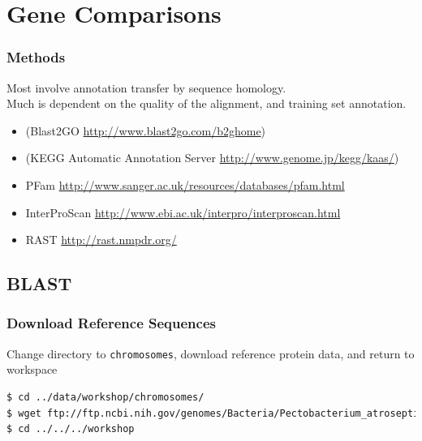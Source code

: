 \documentclass[table]{beamer}
\begin{document}
  \section{Gene Comparisons}
    \begin{frame}
      \frametitle{Methods}   
      Most involve annotation transfer by sequence homology. \\
      Much is dependent on the quality of the alignment, and training set annotation.
      \begin{itemize}
        \item (Blast2GO \url{http://www.blast2go.com/b2ghome})
        \item (KEGG Automatic Annotation Server \url{http://www.genome.jp/kegg/kaas/})
        \item PFam \url{http://www.sanger.ac.uk/resources/databases/pfam.html}
        \item InterProScan \url{http://www.ebi.ac.uk/interpro/interproscan.html}
        \item RAST \url{http://rast.nmpdr.org/}
      \end{itemize}
    \end{frame}

    \subsection{BLAST}
  \begin{frame}[fragile]
    \frametitle{Download Reference Sequences}
    Change directory to \texttt{chromosomes}, download reference protein data, and return to workspace
\begin{lstlisting}[language=bash]
$ cd ../data/workshop/chromosomes/
$ wget ftp://ftp.ncbi.nih.gov/genomes/Bacteria/Pectobacterium_atrosepticum_SCRI1043_uid57957/NC_004547.faa
$ cd ../../../workshop
\end{lstlisting}
\end{frame}
\end{document}
